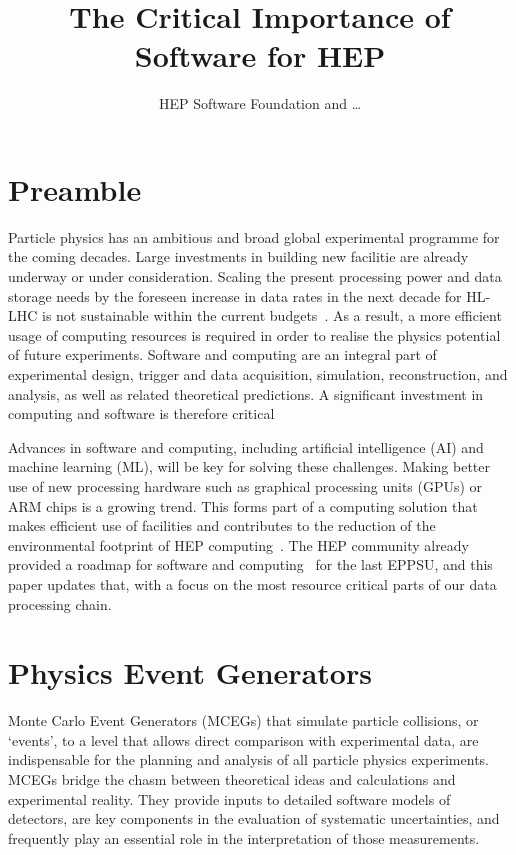 \documentclass[10pt,a4paper]{article}
\begin{document}
\title{The Critical Importance of Software for HEP}

\author{HEP Software Foundation and \dots}

\maketitle

\section{Preamble}\label{preamble}

Particle physics has an ambitious and broad global experimental programme for
the coming decades. Large investments in building new facilitie are already
underway or under consideration. Scaling the present processing power and data
storage needs by the foreseen increase in data rates in the next decade for
HL-LHC is not sustainable within the current
budgets~\cite{CERN-LHCC-2022-005,Software:2815292}. As a result, a more
efficient usage of computing resources is required in order to realise the
physics potential of future experiments. Software and computing are an integral
part of experimental design, trigger and data acquisition, simulation,
reconstruction, and analysis, as well as related theoretical predictions. A
significant investment in computing and software is therefore critical

Advances in software and computing, including artificial intelligence (AI) and
machine learning (ML), will be key for solving these challenges. Making better
use of new processing hardware such as graphical processing units (GPUs) or ARM
chips is a growing trend. This forms part of a computing solution that makes
efficient use of facilities and contributes to the reduction of the
environmental footprint of HEP computing~\cite{wlcgsust}. The HEP community
already provided a roadmap for software and computing~\cite{hsfcwp} for the last
EPPSU, and this paper updates that, with a focus on the most resource critical
parts of our data processing chain.

\section{Physics Event Generators}\label{physics-event-generators}

Monte Carlo Event Generators (MCEGs) that simulate particle collisions,
or `events', to a level that allows direct comparison with
experimental data, are indispensable for the planning and analysis of
all particle physics experiments. MCEGs bridge
the chasm between theoretical ideas and calculations
and experimental reality. They provide inputs to
detailed software models of detectors, are key components in the
evaluation of systematic uncertainties, and frequently
play an essential role in the interpretation of those measurements.
\end{document}
